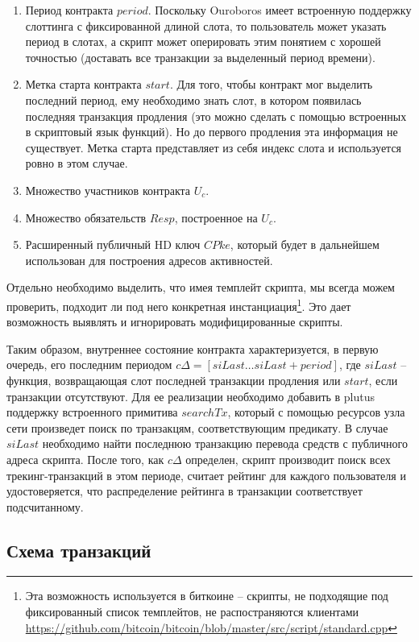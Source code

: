 \documentclass[specification,annotation]{itmo-student-thesis}
\begin{document}
\begin{enumerate}
\item Период контракта $period$. Поскольку Ouroboros имеет встроенную
  поддержку слоттинга с фиксированной длиной слота, то пользователь
  может указать период в слотах, а скрипт может оперировать этим
  понятием с хорошей точностью (доставать все транзакции за выделенный
  период времени).
\item Метка старта контракта $start$. Для того, чтобы контракт мог
  выделить последний период, ему необходимо знать слот, в котором
  появилась последняя транзакция продления (это можно сделать с
  помощью встроенных в скриптовый язык функций). Но до первого
  продления эта информация не существует. Метка старта представляет из
  себя индекс слота и используется ровно в этом случае.
\item Множество участников контракта $U_c$.
\item Множество обязательств $Resp$, построенное на $U_c$.
\item Расширенный публичный HD ключ $CPke$, который будет в дальнейшем
  использован для построения адресов активностей.
\end{enumerate}

Отдельно необходимо выделить, что имея темплейт скрипта, мы всегда
можем проверить, подходит ли под него конкретная
инстанциация\footnote{Эта возможность используется в биткоине --
  скрипты, не подходящие под фиксированный список темплейтов, не
  распостраняются клиентами
  \url{https://github.com/bitcoin/bitcoin/blob/master/src/script/standard.cpp}}. Это
дает возможность выявлять и игнорировать модифицированные скрипты.

Таким образом, внутреннее состояние контракта характеризуется, в
первую очередь, его последним периодом $c\Delta = [siLast \ldots
siLast+period]$, где $siLast$ -- функция, возвращающая слот
последней транзакции продления или $start$, если транзакции
отсутствуют. Для ее реализации необходимо добавить в plutus поддержку
встроенного примитива $searchTx$, который с помощью ресурсов узла сети
произведет поиск по транзакцям, соответствующим предикату. В случае
$siLast$ необходимо найти последнюю транзакцию перевода средств с
публичного адреса скрипта. После того, как $c\Delta$ определен, скрипт
производит поиск всех трекинг-транзакций в этом периоде, считает
рейтинг для каждого пользователя и удостоверяется, что распределение
рейтинга в транзакции соответствует подсчитанному.

\subsection{Схема транзакций}
\end{document}
